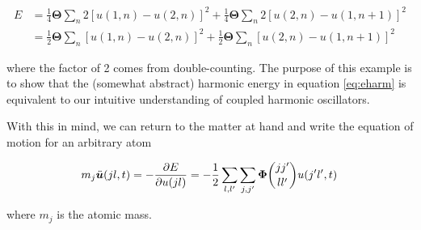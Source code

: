 \begin{align*}
	E &= \frac{1}{4} \bm{\Theta} \sum_n 2 \left[ u(1,n) - u(2,n) \right]^2 + \frac{1}{4} \bm{\Theta} \sum_n 2 \left[ u(2,n) - u(1,n+1) \right]^2 \\
	  &= \frac{1}{2} \bm{\Theta} \sum_n \left[ u(1,n) - u(2,n) \right]^2 + \frac{1}{2} \bm{\Theta} \sum_n \left[ u(2,n) - u(1,n+1) \right]^2
\end{align*}

\noindent where the factor of 2 comes from double-counting. The purpose of this example is to show that the (somewhat abstract) harmonic energy in equation \eqref{eq:eharm} is equivalent to our intuitive understanding of coupled harmonic oscillators. 


With this in mind, we can return to the matter at hand and write the equation of motion for an arbitrary atom

\[ m_j \ddot{\bm{u}}(jl, t) = - \frac{\partial E}{\partial u(jl)} = -\frac{1}{2} \sum_{l,\lp} \sum_{j,\jp} \fc u(\jp \lp, t) \, \]

\noindent where $m_j$ is the atomic mass.






